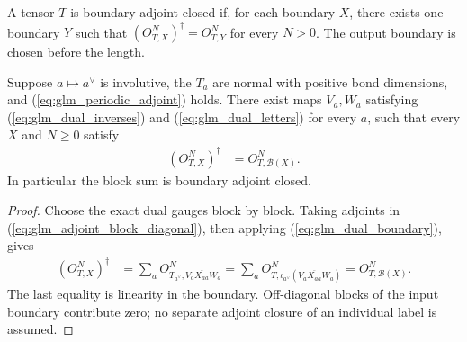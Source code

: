 \begin{definition}
    \label{def:glm_boundary_adjoint_closed}
    \leanok
    A tensor $T$ is boundary adjoint closed if, for each boundary $X$,
    there exists one boundary $Y$ such that
    $(O^N_{T,X})^\dagger=O^N_{T,Y}$ for every $N>0$.
    The output boundary is chosen before the length.
\end{definition}

\begin{lemma}
    \label{thm:glm_normal_block_adjoint}
    \leanok
    Suppose $a\mapsto a^\vee$ is involutive, the $T_a$ are normal with
    positive bond dimensions, and (\ref{eq:glm_periodic_adjoint}) holds.
    There exist maps $V_a,W_a$ satisfying
    (\ref{eq:glm_dual_inverses}) and (\ref{eq:glm_dual_letters}) for every
    $a$, such that every $X$ and $N\geq0$ satisfy
    \begin{align}
        (O^N_{T,X})^\dagger & =O^N_{T,\mathcal B(X)}.
        \label{eq:glm_normal_block_adjoint}
    \end{align}
    In particular the block sum is boundary adjoint closed.
\end{lemma}
\begin{proof}\leanok
    Choose the exact dual gauges block by block. Taking adjoints in
    (\ref{eq:glm_adjoint_block_diagonal}), then applying
    (\ref{eq:glm_dual_boundary}), gives
    \begin{align*}
        (O^N_{T,X})^\dagger
         & =\sum_aO^N_{T_{a^\vee},V_a\overline{X_{aa}}W_a}
        =\sum_aO^N_{T,\iota_{a^\vee}(V_a\overline{X_{aa}}W_a)}
        =O^N_{T,\mathcal B(X)}.
    \end{align*}
    The last equality is linearity in the boundary. Off-diagonal blocks
    of the input boundary contribute zero; no separate adjoint closure
    of an individual label is assumed.
\end{proof}


